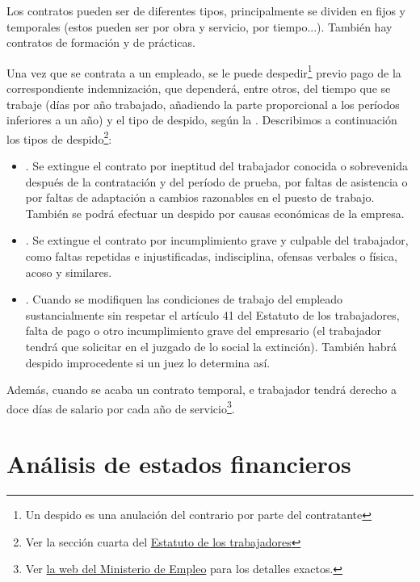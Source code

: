 \documentclass[nochap,palatino,shortheader]{apuntes}
\begin{document}
Los contratos pueden ser de diferentes tipos, principalmente se dividen en fijos y temporales (estos pueden ser por obra y servicio, por tiempo...). También hay contratos de formación y de prácticas.

Una vez que se contrata a un empleado, se le puede despedir\footnote{Un despido es una anulación del contrario por parte del contratante} previo pago de la correspondiente indemnización, que dependerá, entre otros, del tiempo que se trabaje (días por año trabajado, añadiendo la parte proporcional a los períodos inferiores a un año) y el tipo de despido, según la . Describimos a continuación los tipos de despido\footnote{Ver la sección cuarta del \href{https://www.boe.es/buscar/act.php?id=BOE-A-1995-7730&tn=1&p=20151024}{Estatuto de los trabajadores}}:

\begin{itemize}
\item {}. Se extingue el contrato por ineptitud del trabajador conocida o sobrevenida después de la contratación y del período de prueba, por faltas de asistencia o por faltas de adaptación a cambios razonables en el puesto de trabajo. También se podrá efectuar un despido por causas económicas de la empresa.
\item {}. Se extingue el contrato por incumplimiento grave y culpable del trabajador, como faltas repetidas e injustificadas, indisciplina, ofensas verbales o física, acoso y similares.
\item {}. Cuando se modifiquen las condiciones de trabajo del empleado sustancialmente sin respetar el artículo 41 del Estatuto de los trabajadores, falta de pago o otro incumplimiento grave del empresario (el trabajador tendrá que solicitar en el juzgado de lo social la extinción). También habrá despido improcedente si un juez lo determina así.
\end{itemize}

Además, cuando se acaba un contrato temporal, e trabajador tendrá derecho a doce días de salario por cada año de servicio\footnote{Ver \href{http://www.empleo.gob.es/es/Guia/texto/guia_7/contenidos/guia_7_16_4.htm}{la web del Ministerio de Empleo} para los detalles exactos.}.

\section{Análisis de estados financieros}
\end{document}

